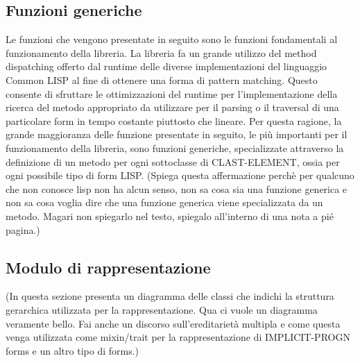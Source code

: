 \subsection{Funzioni generiche}

Le funzioni che vengono presentate in seguito sono le funzioni fondamentali al funzionamento della libreria. La libreria fa un grande utilizzo del method dispatching offerto dal runtime delle diverse implementazioni del linguaggio Common LISP al fine di ottenere una forma di pattern matching. Questo consente di sfruttare le ottimizzazioni del runtime per l'implementazione della ricerca del metodo appropriato da utilizzare per il parsing o il traversal di una particolare form in tempo costante piuttosto che lineare. Per questa ragione, la grande maggioranza delle funzione presentate in seguito, le più importanti per il funzionamento della libreria, sono funzioni generiche, specializzate attraverso la definizione di un metodo per ogni sottoclasse di CLAST-ELEMENT, ossia per ogni possibile tipo di form LISP. (Spiega questa affermazione perchè per qualcuno che non conosce lisp non ha alcun senso, non sa cosa sia una funzione generica e non sa cosa voglia dire che una funzione generica viene specializzata da un metodo. Magari non spiegarlo nel testo, spiegalo all'interno di una nota a pié pagina.)

\subsection{Modulo di rappresentazione}

(In questa sezione presenta un diagramma delle classi che indichi la struttura gerarchica utilizzata per la rappresentazione. Qua ci vuole un diagramma veramente bello. Fai anche un discorso sull'ereditarietà multipla e come questa venga utilizzata come mixin/trait per la rappresentazione di IMPLICIT-PROGN forms e un altro tipo di forms.)\\

